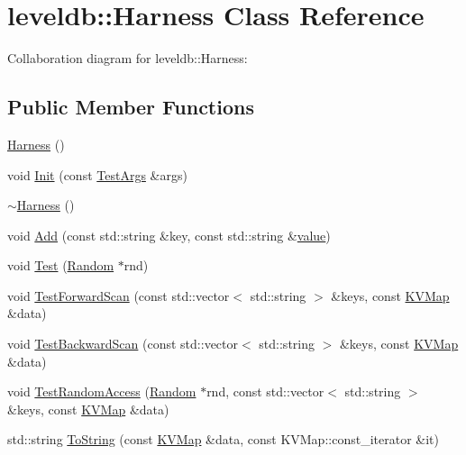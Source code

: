 \hypertarget{classleveldb_1_1_harness}{\section{leveldb\-:\-:Harness Class Reference}
\label{classleveldb_1_1_harness}
}


Collaboration diagram for leveldb\-:\-:Harness\-:
\subsection*{Public Member Functions}
\begin{DoxyCompactItemize}
\item 
\hyperlink{classleveldb_1_1_harness_a37601b2f232e45cb7607aa8d2ecb25db}{Harness} ()
\item 
void \hyperlink{classleveldb_1_1_harness_a2aba24255691eaad2a57ee43cbc9ddc1}{Init} (const \hyperlink{structleveldb_1_1_test_args}{Test\-Args} \&args)
\item 
\hyperlink{classleveldb_1_1_harness_a9956e6945c11e5024ae1f82fd8528343}{$\sim$\-Harness} ()
\item 
void \hyperlink{classleveldb_1_1_harness_a019ddc8e52dc5cfaac85f53993ab1ed4}{Add} (const std\-::string \&key, const std\-::string \&\hyperlink{cache_8cc_a0f61d63b009d0880a89c843bd50d8d76}{value})
\item 
void \hyperlink{classleveldb_1_1_harness_a78dbb5352b51e22bbc449bad7c1a9176}{Test} (\hyperlink{classleveldb_1_1_random}{Random} $\ast$rnd)
\item 
void \hyperlink{classleveldb_1_1_harness_ac5ff108406a08a6e3e22318246d206ef}{Test\-Forward\-Scan} (const std\-::vector$<$ std\-::string $>$ \&keys, const \hyperlink{namespaceleveldb_aac1e50450147be263e08252c6700f7a7}{K\-V\-Map} \&data)
\item 
void \hyperlink{classleveldb_1_1_harness_aba7a2c48101cd9d024be64080ebed363}{Test\-Backward\-Scan} (const std\-::vector$<$ std\-::string $>$ \&keys, const \hyperlink{namespaceleveldb_aac1e50450147be263e08252c6700f7a7}{K\-V\-Map} \&data)
\item 
void \hyperlink{classleveldb_1_1_harness_adb4b24bd89b600a67b0cd52ff64af9cd}{Test\-Random\-Access} (\hyperlink{classleveldb_1_1_random}{Random} $\ast$rnd, const std\-::vector$<$ std\-::string $>$ \&keys, const \hyperlink{namespaceleveldb_aac1e50450147be263e08252c6700f7a7}{K\-V\-Map} \&data)
\item 
std\-::string \hyperlink{classleveldb_1_1_harness_a69962f92cdd4fdc5d1f91d8c3cbebb3f}{To\-String} (const \hyperlink{namespaceleveldb_aac1e50450147be263e08252c6700f7a7}{K\-V\-Map} \&data, const K\-V\-Map\-::const\-\_\-iterator \&it)

\end{DoxyCompactItemize}
